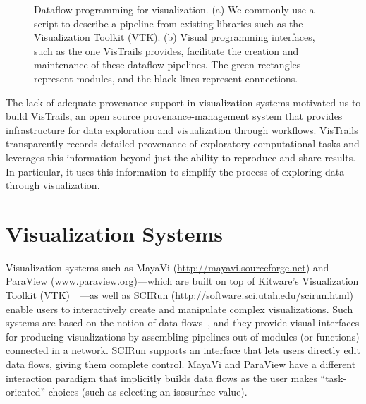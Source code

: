 \documentclass[11pt,twocolumn]{article}
\begin{document}
\begin{figure}[t]
\caption{Dataflow programming for visualization. (a) We commonly use a
  script to describe a pipeline from existing libraries such as the
  Visualization Toolkit (VTK). (b) Visual programming interfaces, such
  as the one VisTrails provides, facilitate the creation and
  maintenance of these dataflow pipelines. The green rectangles
  represent modules, and the black lines represent connections.}
\label{fig:fig1}
\end{figure}

The lack of adequate provenance support in visualization systems
motivated us to build VisTrails, an open source provenance-management
system that provides infrastructure for data exploration and
visualization through workflows. VisTrails transparently records
detailed provenance of exploratory computational tasks and leverages
this information beyond just the ability to reproduce and share
results. In particular, it uses this information to simplify the
process of exploring data through visualization.

\section{Visualization Systems}

Visualization systems such as MayaVi
(\url{http://mayavi.sourceforge.net}) and ParaView
(\url{www.paraview.org})—which are built on top of Kitware's
Visualization Toolkit (VTK)~\cite{Schroeder:2003:VTK}~—as well as
SCIRun (\url{http://software.sci.utah.edu/scirun.html}) enable users
to interactively create and manipulate complex visualizations. Such
systems are based on the notion of data flows~\cite{lee@ieee1995}, and
they provide visual interfaces for producing visualizations by
assembling pipelines out of modules (or functions) connected in a
network. SCIRun supports an interface that lets users directly edit
data flows, giving them complete control. MayaVi and ParaView have a
different interaction paradigm that implicitly builds data flows as
the user makes “task-oriented” choices (such as selecting an
isosurface value).
\end{document}
